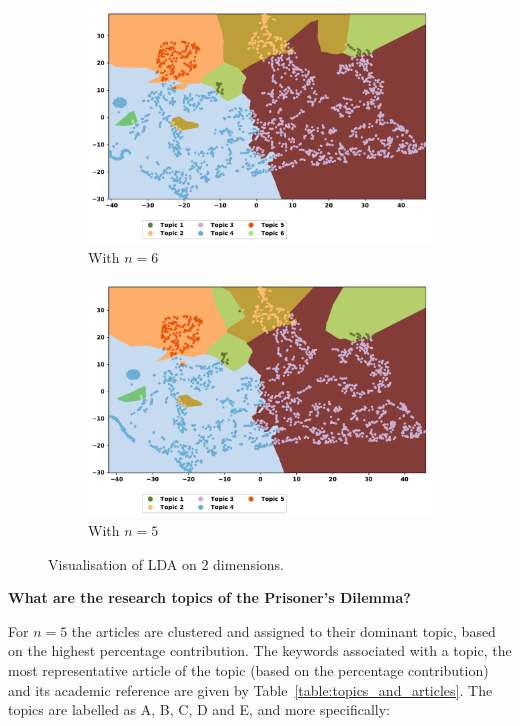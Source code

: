 \documentclass{article}
\theoremstyle{definition}
\begin{document}
\begin{figure}[!hbtp]
    \centering
    \begin{subfigure}{.45\textwidth}
        \centering
        \includegraphics[width=.9\textwidth]{./assets/images/topics_scatter_plot_6.pdf}
        \caption{With \(n=6\)}\label{fig:lda_visualisation_six}
    \end{subfigure}\hfill
    \begin{subfigure}{.45\textwidth}
        \centering
        \includegraphics[width=.9\textwidth]{./assets/images/topics_scatter_plot_5.pdf}
        \caption{With \(n=5\)}\label{fig:lda_visualisation_five}
    \end{subfigure}
    \caption{Visualisation of LDA on 2 dimensions.}
\end{figure}

\textbf{What are the research topics of the Prisoner's Dilemma?}

For \(n=5\) the articles are clustered and assigned to their dominant topic,
based on the highest percentage contribution. The keywords associated with a
topic, the most representative article of the topic (based on the
percentage contribution) and its academic reference are given by
Table~\ref{table:topics_and_articles}. The topics are labelled as A, B, C, D and
E, and more specifically:
\end{document}
